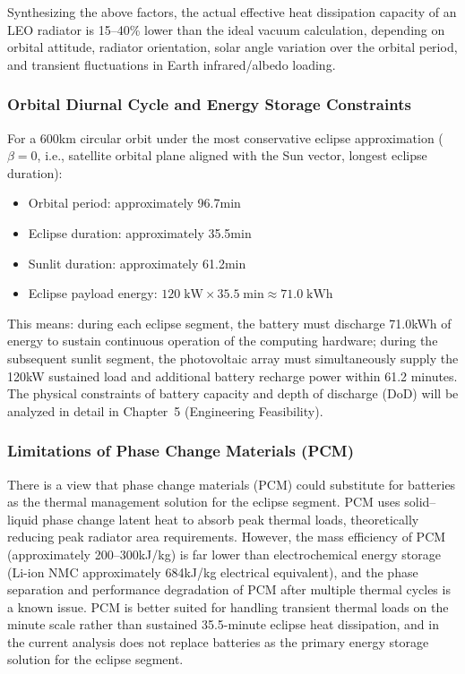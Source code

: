 Synthesizing the above factors, the actual effective heat dissipation capacity of an LEO radiator is 15--40\% lower than the ideal vacuum calculation, depending on orbital attitude, radiator orientation, solar angle variation over the orbital period, and transient fluctuations in Earth infrared/albedo loading.

\subsubsection{Orbital Diurnal Cycle and Energy Storage Constraints}

For a 600\;km circular orbit under the most conservative eclipse approximation ($\beta = 0$, i.e., satellite orbital plane aligned with the Sun vector, longest eclipse duration):

\begin{itemize}[leftmargin=*]
    \item Orbital period: approximately 96.7\;min
    \item Eclipse duration: approximately 35.5\;min
    \item Sunlit duration: approximately 61.2\;min
    \item Eclipse payload energy: $120\;\text{kW} \times 35.5\;\text{min} \approx 71.0\;\text{kWh}$
\end{itemize}

This means: during each eclipse segment, the battery must discharge 71.0\;kWh of energy to sustain continuous operation of the computing hardware; during the subsequent sunlit segment, the photovoltaic array must simultaneously supply the 120\;kW sustained load and additional battery recharge power within 61.2 minutes. The physical constraints of battery capacity and depth of discharge (DoD) will be analyzed in detail in Chapter~5 (Engineering Feasibility).

\subsubsection{Limitations of Phase Change Materials (PCM)}

There is a view that phase change materials (PCM) could substitute for batteries as the thermal management solution for the eclipse segment. PCM uses solid--liquid phase change latent heat to absorb peak thermal loads, theoretically reducing peak radiator area requirements. However, the mass efficiency of PCM (approximately 200--300\;kJ/kg) is far lower than electrochemical energy storage (Li-ion NMC approximately 684\;kJ/kg electrical equivalent), and the phase separation and performance degradation of PCM after multiple thermal cycles is a known issue\cite{ijisrt2025pcm}. PCM is better suited for handling transient thermal loads on the minute scale rather than sustained 35.5-minute eclipse heat dissipation, and in the current analysis does not replace batteries as the primary energy storage solution for the eclipse segment.

